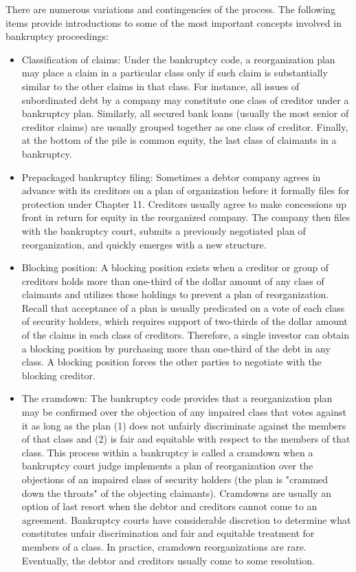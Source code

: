 \documentclass[11pt]{article}
\begin{document}
There are numerous variations and contingencies of the process. The following items provide introductions to some of the most important concepts involved in bankruptcy proceedings:

\begin{itemize}
  \item Classification of claims: Under the bankruptcy code, a reorganization plan may place a claim in a particular class only if such claim is substantially similar to the other claims in that class. For instance, all issues of subordinated debt by a company may constitute one class of creditor under a bankruptcy plan. Similarly, all secured bank loans (usually the most senior of creditor claims) are usually grouped together as one class of creditor. Finally, at the bottom of the pile is common equity, the last class of claimants in a bankruptcy.
  \item Prepackaged bankruptcy filing: Sometimes a debtor company agrees in advance with its creditors on a plan of organization before it formally files for protection under Chapter 11. Creditors usually agree to make concessions up front in return for equity in the reorganized company. The company then files with the bankruptcy court, submits a previously negotiated plan of reorganization, and quickly emerges with a new structure.
  \item Blocking position: A blocking position exists when a creditor or group of creditors holds more than one-third of the dollar amount of any class of claimants and utilizes those holdings to prevent a plan of reorganization. Recall that acceptance of a plan is usually predicated on a vote of each class of security holders, which requires support of two-thirds of the dollar amount of the claims in each class of creditors. Therefore, a single investor can obtain a blocking position by purchasing more than one-third of the debt in any class. A blocking position forces the other parties to negotiate with the blocking creditor.
  \item The cramdown: The bankruptcy code provides that a reorganization plan may be confirmed over the objection of any impaired class that votes against it as long as the plan (1) does not unfairly discriminate against the members of that class and (2) is fair and equitable with respect to the members of that class. This process within a bankruptcy is called a cramdown when a bankruptcy court judge implements a plan of reorganization over the objections of an impaired class of security holders (the plan is "crammed down the throats" of the objecting claimants). Cramdowns are usually an option of last resort when the debtor and creditors cannot come to an agreement. Bankruptcy courts have considerable discretion to determine what constitutes unfair discrimination and fair and equitable treatment for members of a class. In practice, cramdown reorganizations are rare. Eventually, the debtor and creditors usually come to some resolution.

\end{itemize}
\end{document}
